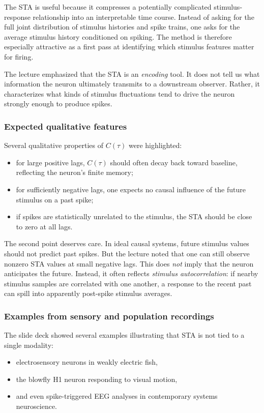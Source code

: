 \documentclass[11pt]{article}
\begin{document}
The STA is useful because it compresses a potentially complicated stimulus-response relationship into an interpretable time course. Instead of asking for the full joint distribution of stimulus histories and spike trains, one asks for the average stimulus history conditioned on spiking. The method is therefore especially attractive as a first pass at identifying which stimulus features matter for firing.

The lecture emphasized that the STA is an \emph{encoding} tool. It does not tell us what information the neuron ultimately transmits to a downstream observer. Rather, it characterizes what kinds of stimulus fluctuations tend to drive the neuron strongly enough to produce spikes.

\subsubsection{Expected qualitative features}

Several qualitative properties of $C(\tau)$ were highlighted:
\begin{itemize}
    \item for large positive lags, $C(\tau)$ should often decay back toward baseline, reflecting the neuron's finite memory;
    \item for sufficiently negative lags, one expects no causal influence of the future stimulus on a past spike;
    \item if spikes are statistically unrelated to the stimulus, the STA should be close to zero at all lags.
\end{itemize}

The second point deserves care. In ideal causal systems, future stimulus values should not predict past spikes. But the lecture noted that one can still observe nonzero STA values at small negative lags. This does \emph{not} imply that the neuron anticipates the future. Instead, it often reflects \emph{stimulus autocorrelation}: if nearby stimulus samples are correlated with one another, a response to the recent past can spill into apparently post-spike stimulus averages.

\subsubsection{Examples from sensory and population recordings}

The slide deck showed several examples illustrating that STA is not tied to a single modality:
\begin{itemize}
    \item electrosensory neurons in weakly electric fish,
    \item the blowfly H1 neuron responding to visual motion,
    \item and even spike-triggered EEG analyses in contemporary systems neuroscience.
\end{itemize}
\end{document}
